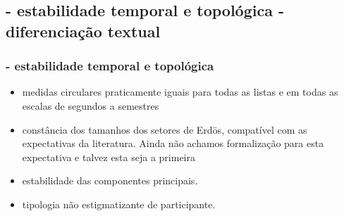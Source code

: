 \documentclass[10pt]{beamer}
\begin{document}
\subsection{- estabilidade temporal e topológica \;\; - diferenciação textual}
\begin{frame}
\frametitle{- estabilidade temporal e topológica}
\begin{itemize}
	\item medidas circulares praticamente iguais para todas as listas e em todas as escalas de segundos a semestres
	\item constância dos tamanhos dos setores de Erdös, compatível com as expectativas da literatura. Ainda não achamos formalização para esta expectativa e talvez esta seja a primeira
	\item estabilidade das componentes principais.
	\item tipologia não estigmatizante de participante.
\end{itemize}
\end{frame}
\end{document}
